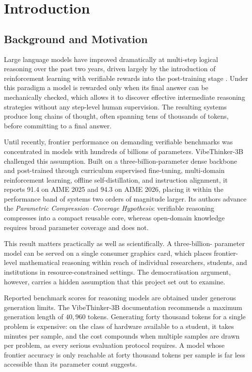 \documentclass[12pt,a4paper,oneside]{report}
\begin{document}
\chapter{Introduction}

\section{Background and Motivation}

Large language models have improved dramatically at multi-step logical reasoning
over the past two years, driven largely by the introduction of reinforcement
learning with verifiable rewards into the post-training stage
\cite{deepseekr1,deepseekmath}. Under this paradigm a model is rewarded only
when its final answer can be mechanically checked, which allows it to discover
effective intermediate reasoning strategies without any step-level human
supervision. The resulting systems produce long chains of thought, often
spanning tens of thousands of tokens, before committing to a final answer.

Until recently, frontier performance on demanding verifiable benchmarks was
concentrated in models with hundreds of billions of parameters. VibeThinker-3B
\cite{vibethinker} challenged this assumption. Built on a three-billion-parameter
dense backbone \cite{qwen25coder} and post-trained through curriculum supervised
fine-tuning, multi-domain reinforcement learning, offline self-distillation, and
instruction alignment, it reports 91.4 on AIME 2025 and 94.3 on AIME 2026,
placing it within the performance band of systems two orders of magnitude
larger. Its authors advance the \emph{Parametric Compression--Coverage
Hypothesis}: verifiable reasoning compresses into a compact reusable core,
whereas open-domain knowledge requires broad parameter coverage and does not.

This result matters practically as well as scientifically. A three-billion-
parameter model can be served on a single consumer graphics card, which places
frontier-level mathematical reasoning within reach of individual researchers,
students, and institutions in resource-constrained settings. The
democratisation argument, however, carries a hidden assumption that this project
set out to examine.

Reported benchmark scores for reasoning models are obtained under generous
generation limits. The VibeThinker-3B documentation recommends a maximum
generation length of $40{,}960$ tokens. Generating forty thousand tokens for a
single problem is expensive: on the class of hardware available to a student, it
takes minutes per sample, and the cost compounds when multiple samples are drawn
per problem, as every serious evaluation protocol requires. A model whose
frontier accuracy is only reachable at forty thousand tokens per sample is far
less accessible than its parameter count suggests.
\end{document}
